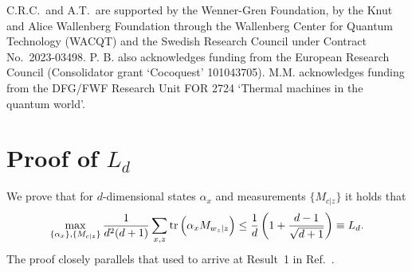 \documentclass[aps,superscriptaddress,twocolumn,twoside,floatfix,pra,nofootinbib,a4paper]{revtex4-2}
\begin{document}
\begin{acknowledgments}
C.R.C.~and A.T.~are supported  by the  Wenner-Gren Foundation, by the Knut and Alice Wallenberg Foundation through the Wallenberg Center for Quantum Technology (WACQT) and the Swedish Research Council under Contract No.~2023-03498. P. B. also acknowledges funding from the European Research Council (Consolidator grant `Cocoquest' 101043705). M.M. acknowledges funding from the DFG/FWF Research Unit FOR 2724 `Thermal machines in the quantum world'.
\end{acknowledgments}











\appendix

\section{Proof of $L_d$}\label{App:firstgame}
We prove that for $d$-dimensional states $\alpha_x$ and measurements $\{M_{c|z}\}$ it holds that
\begin{equation}\label{quantity}
\max_{\{\alpha_x\}, \{M_{c|z}\}} \frac{1}{d^2(d+1)}\sum_{x,z} \tr\left(\alpha_x M_{w_z|z}\right) \leq  \frac{1}{d}\left(1+\frac{d-1}{\sqrt{d+1}}\right)\equiv L_d.
\end{equation}
The proof closely parallels that  used to arrive at Result~1 in Ref.~\cite{farkas2023simple}. 
\end{document}
